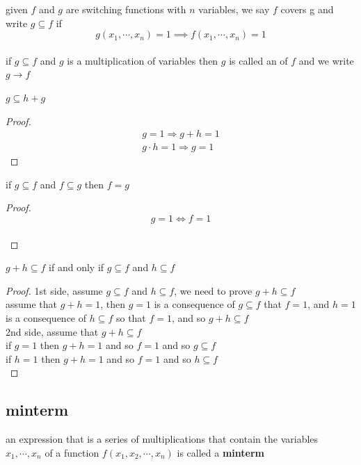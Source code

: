 \documentclass[a4paper,12pt]{article}
\begin{document}
given \(f\) and \(g\) are switching functions with \(n\) variables, we say \(f\) covers g and write \(g \subseteq f\) if\\
\[
  g(x_1, \cdots, x_n) = 1 \implies f(x_1, \cdots, x_n) = 1
\]\\
if \(g \subseteq f\) and \(g\) is a multiplication of variables then \(g\) is called an of \(f\) and we write \(g \rightarrow f\)\\
\begin{lemma}
\(g \subseteq h + g\)\\
\begin{proof}
\begin{gather*}
  g = 1 \Rightarrow g + h = 1\\
  g \cdot h = 1 \Rightarrow g = 1
\end{gather*}
\end{proof}
\end{lemma}
\begin{lemma}
if \(g \subseteq f\) and \(f \subseteq g\) then \(f = g\)\\
\begin{proof}
\[
  g = 1 \Leftrightarrow f = 1
\]\\
\end{proof}
\end{lemma}
\begin{lemma}
\(g + h \subseteq f\) if and only if \(g \subseteq f\) and \(h \subseteq f\)\\
\begin{proof}
1st side, assume \(g \subseteq f\) and \(h \subseteq f\), we need to prove \(g + h \subseteq f\)\\
assume that \(g + h = 1\), then \(g = 1\) is a consequence of \(g \subseteq f\) that \(f = 1\), and \(h = 1\) is a consequence of \(h \subseteq f\) so that \(f = 1\), and so \(g + h \subseteq f\)\\
2nd side, assume that \(g + h \subseteq f\)\\
if \(g = 1\) then \(g + h = 1\) and so \(f = 1\) and so \(g \subseteq f\)\\
if \(h = 1\) then \(g + h = 1\) and so \(f = 1\) and so \(h \subseteq f\)\\
\end{proof}
\end{lemma}
\subsection{minterm}
\label{sec:org07fe4e3}
\begin{definition}
an expression that is a series of multiplications that contain the variables \(x_1, \cdots, x_n\) of a function \(f(x_1, x_2, \cdots, x_n)\) is called a \textbf{minterm}\\
\end{definition}
\end{document}
